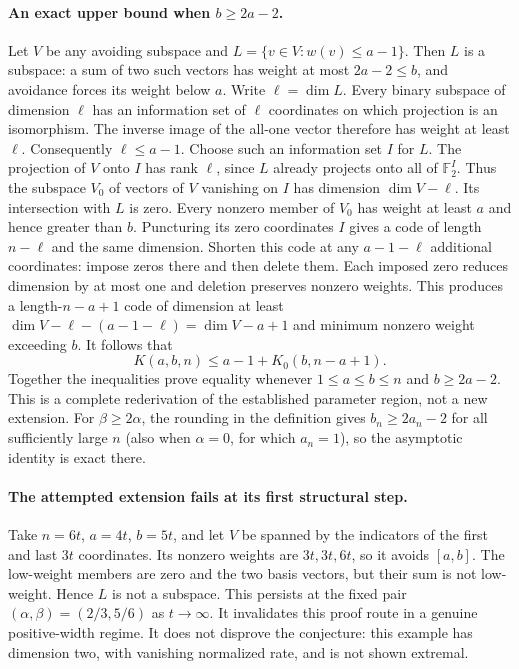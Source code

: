 \documentclass[11pt]{article}
\begin{document}
\paragraph{An exact upper bound when $b\ge2a-2$.}
Let $V$ be any avoiding subspace and
$L=\{v\in V:w(v)\le a-1\}$. Then $L$ is a subspace: a sum of two such
vectors has weight at most $2a-2\le b$, and avoidance forces its weight
below $a$. Write $\ell=\dim L$. Every binary subspace of dimension $\ell$
has an information set of $\ell$ coordinates on which projection is an
isomorphism. The inverse image of the all-one vector therefore has weight
at least $\ell$. Consequently $\ell\le a-1$.
Choose such an information set $I$ for $L$. The projection of $V$ onto $I$
has rank $\ell$, since $L$ already projects onto all of $\mathbb F_2^I$.
Thus the subspace $V_0$ of vectors of $V$ vanishing on $I$ has dimension
$\dim V-\ell$. Its intersection with $L$ is zero. Every nonzero member of
$V_0$ has weight at least $a$ and hence greater than $b$.
Puncturing its zero coordinates $I$ gives a code of length $n-\ell$ and
the same dimension. Shorten this code at any $a-1-\ell$ additional
coordinates: impose zeros there and then delete them. Each imposed zero
reduces dimension by at most one and deletion preserves nonzero weights.
This produces a length-$n-a+1$ code of dimension at least
$\dim V-\ell-(a-1-\ell)=\dim V-a+1$ and minimum nonzero weight exceeding
$b$. It follows that
\[
K(a,b,n)\le a-1+K_0(b,n-a+1).
\]
Together the inequalities prove equality whenever $1\le a\le b\le n$
and $b\ge2a-2$. This is a complete rederivation of the established parameter
region, not a new extension. For $\beta\ge2\alpha$, the rounding in the
definition gives $b_n\ge2a_n-2$ for all sufficiently large $n$ (also when
$\alpha=0$, for which $a_n=1$), so the asymptotic identity is exact there.

\paragraph{The attempted extension fails at its first structural step.}
Take $n=6t$, $a=4t$, $b=5t$, and let $V$ be spanned by the indicators of
the first and last $3t$ coordinates. Its nonzero weights are $3t,3t,6t$,
so it avoids $[a,b]$. The low-weight members are zero and the two basis
vectors, but their sum is not low-weight. Hence $L$ is not a subspace.
This persists at the fixed pair $(\alpha,\beta)=(2/3,5/6)$ as $t\to\infty$.
It invalidates this proof route in a genuine positive-width regime. It does
not disprove the conjecture: this example has dimension two, with vanishing
normalized rate, and is not shown extremal.
\end{document}
